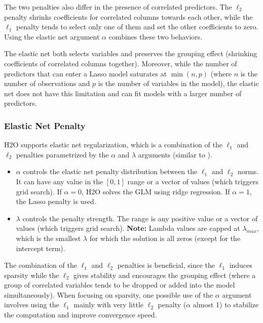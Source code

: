 The two penalties also differ in the presence of correlated
predictors. The $\ell_2$ penalty shrinks coefficients for correlated columns towards each other, while the $\ell_1$ penalty
tends to select only one of them and set the other coefficients to zero. Using the elastic net argument $\alpha$ combines these two behaviors. 

The elastic net both selects variables and preserves the grouping effect (shrinking coefficients of correlated columns together). Moreover, while the number of predictors that can enter a Lasso model saturates at $\min(n,p)$ (where $n$ is the number of observations and $p$ is the number of variables in the model), the elastic net does not have this limitation and can fit models with a larger number of predictors. %

\subsubsection{Elastic Net Penalty}

H2O supports elastic net regularization, which is a combination of the $\ell_1$ and $\ell_2$ penalties parametrized by the $\alpha$ and $\lambda$ arguments (similar to ).
\begin{itemize}
\item $\alpha$ controls the elastic net penalty distribution between the $\ell_1$ and $\ell_2$ norms. It can have any value
in the $[0,1]$ range or a vector of values (which triggers grid search). If $\alpha = 0$, H2O solves the GLM using ridge regression. If $\alpha = 1$, the Lasso penalty is used.
\item $\lambda$ controls the penalty strength. The range is any positive value or a vector of values (which triggers grid search). 
\textbf{Note:} Lambda values are capped at $\lambda_{max}$, which is the smallest $\lambda$ for which the solution is
all zeros (except for the intercept term). %
\end{itemize}

The combination of the $\ell_1$ and $\ell_2$ penalties is beneficial, since the $\ell_1$ induces sparsity while the $\ell_2$ gives
stability and encourages the grouping effect (where a group of correlated variables tends to be dropped or added
into the model simultaneously). When focusing on sparsity, one possible use of the $\alpha$ argument  involves using the $\ell_1$ mainly with very little $\ell_2$ penalty
($\alpha$ almost 1) to stabilize the computation and improve convergence speed.

